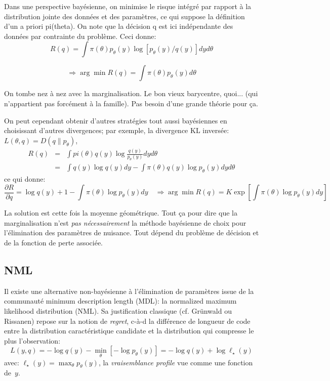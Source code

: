 \documentclass{article}
\begin{document}
Dans une perspective bay\'esienne, on minimise le risque int\'egr\'e par rapport \`a la distribution jointe des donn\'ees et des param\`etres, ce qui suppose la d\'efinition d'un a priori pi(theta). On note que la d\'ecision q est ici ind\'ependante des donn\'ees par contrainte du probl\`eme. Ceci donne: 
$$R(q) = \int \pi(\theta) p_\theta(y) \log [p_\theta(y) / q(y)] dy d\theta$$ 

$$\Rightarrow \arg\min R(q) = \int \pi(\theta) p_\theta(y) d\theta$$ 

On tombe nez \`a nez avec la marginalisation. Le bon vieux barycentre, quoi... (qui n'appartient pas forc\'ement \`a la famille). Pas besoin d'une grande th\'eorie pour \c{c}a. 

On peut cependant obtenir d'autres strat\'egies tout aussi bay\'esiennes en choisissant d'autres divergences; par exemple, la divergence KL invers\'ee: $L(\theta, q) = D(q\|p_\theta)$,
\begin{eqnarray*}
R(q) 
& = & \int pi(\theta)q(y) \log \frac{q(y)}{p_\theta(y)} dy d\theta \\
& = & \int q(y) \log q(y) dy  - \int \pi(\theta) q(y) \log p_\theta(y) dy d\theta
\end{eqnarray*}
ce qui donne:
$$ 
\frac{\partial R}{\partial q}
= \log q(y) + 1 - \int \pi(\theta) \log p_\theta(y) dy 
\quad \Rightarrow 
\arg\min R(q) = K \exp\left[\int \pi(\theta) \log p_\theta(y) dy \right]
$$ 

La solution est cette fois la moyenne g\'eom\'etrique. Tout \c{c}a pour dire que la marginalisation n'est {\em pas n\'ecessairement} la m\'ethode bay\'esienne de choix pour l'\'elimination des param\`etres de nuisance. Tout d\'epend du probl\`eme de d\'ecision et de la fonction de perte associ\'ee. 


\subsection{NML}

Il existe une alternative non-bay\'esienne \`a l'\'elimination de param\`etres issue de la communaut\'e minimum description length (MDL): la normalized maximum likelihood distribution (NML). Sa justification classique (cf. Gr\"unwald ou Rissanen) repose sur la notion de {\em regret}, c-\`a-d la diff\'erence de longueur de code entre la distribution caract\'eristique candidate et la distribution qui compresse le plus l'observation: 
$$
L(y, q) = - \log q(y) - \min_\theta [-\log p_\theta(y)] = -\log q(y) + \log \ell_\star(y)
$$ 
avec: $\ell_\star(y) = \max_\theta p_\theta(y)$, la {\em vraisemblance profile} vue comme une fonction de~$y$.
\end{document}
